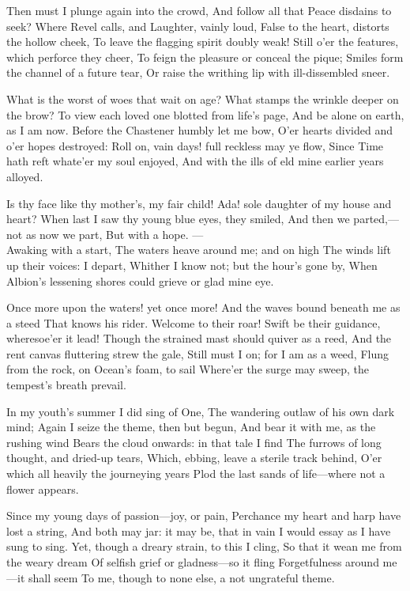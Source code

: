 \documentclass[10pt,twocolumn]{book}
\begin{document}
   Then must I plunge again into the crowd,
   And follow all that Peace disdains to seek?
   Where Revel calls, and Laughter, vainly loud,
   False to the heart, distorts the hollow cheek,
   To leave the flagging spirit doubly weak!
   Still o'er the features, which perforce they cheer,
   To feign the pleasure or conceal the pique;
   Smiles form the channel of a future tear,
Or raise the writhing lip with ill-dissembled sneer.


   What is the worst of woes that wait on age?
   What stamps the wrinkle deeper on the brow?
   To view each loved one blotted from life's page,
   And be alone on earth, as I am now.
   Before the Chastener humbly let me bow,
   O'er hearts divided and o'er hopes destroyed:
   Roll on, vain days! full reckless may ye flow,
   Since Time hath reft whate'er my soul enjoyed,
And with the ills of eld mine earlier years alloyed.



\canto


   Is thy face like thy mother's, my fair child!
   Ada! sole daughter of my house and heart?
   When last I saw thy young blue eyes, they smiled,
   And then we parted,---not as now we part,
   But with a hope. --- \\
                    Awaking with a start,
   The waters heave around me; and on high
   The winds lift up their voices:  I depart,
   Whither I know not; but the hour's gone by,
When Albion's lessening shores could grieve or glad mine eye.


   Once more upon the waters! yet once more!
   And the waves bound beneath me as a steed
   That knows his rider.  Welcome to their roar!
   Swift be their guidance, wheresoe'er it lead!
   Though the strained mast should quiver as a reed,
   And the rent canvas fluttering strew the gale,
   Still must I on; for I am as a weed,
   Flung from the rock, on Ocean's foam, to sail
Where'er the surge may sweep, the tempest's breath prevail.

   In my youth's summer I did sing of One,
   The wandering outlaw of his own dark mind;
   Again I seize the theme, then but begun,
   And bear it with me, as the rushing wind
   Bears the cloud onwards:  in that tale I find
   The furrows of long thought, and dried-up tears,
   Which, ebbing, leave a sterile track behind,
   O'er which all heavily the journeying years
Plod the last sands of life---where not a flower appears.

   Since my young days of passion---joy, or pain,
   Perchance my heart and harp have lost a string,
   And both may jar:  it may be, that in vain
   I would essay as I have sung to sing.
   Yet, though a dreary strain, to this I cling,
   So that it wean me from the weary dream
   Of selfish grief or gladness---so it fling
   Forgetfulness around me---it shall seem
To me, though to none else, a not ungrateful theme.
\end{document}
